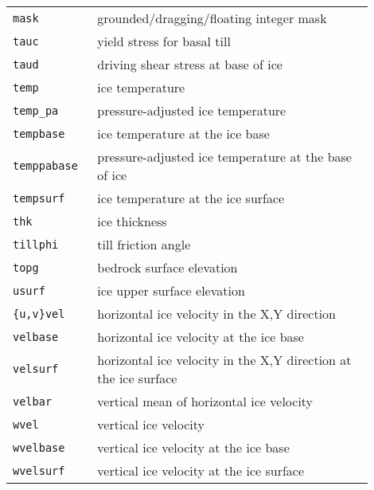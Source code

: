 \documentclass[landscape]{article}
\begin{document}
\begin{textblock}{15}
\begin{tabular}{@{}p{0.2\linewidth}p{0.7\linewidth}@{}}
  \texttt{mask} &  grounded/dragging/floating integer mask \\
  \texttt{tauc} &  yield stress for basal till \\
  \texttt{taud} &  driving shear stress at base of ice \\
  \texttt{temp} &  ice temperature \\
  \texttt{temp_pa} &  pressure-adjusted ice temperature \\
  \texttt{tempbase} &  ice temperature at the ice base\\
  \texttt{temppabase} &  pressure-adjusted ice temperature at the base of ice\\
  \texttt{tempsurf} &  ice temperature at the ice surface\\
  \texttt{thk} &  ice thickness\\
  \texttt{tillphi} &  till friction angle \\
  \texttt{topg} &  bedrock surface elevation \\
  \texttt{usurf} &  ice upper surface elevation \\
  \texttt{\{u,v\}vel} &  horizontal ice velocity in the X,Y direction \\
  \texttt{velbase} &  horizontal  ice velocity at the ice base\\
  \texttt{velsurf} &  horizontal ice velocity in the X,Y direction
  at the ice surface\\
  \texttt{velbar} &  vertical mean of horizontal ice velocity\\
  \texttt{wvel} &  vertical ice velocity \\
  \texttt{wvelbase} &  vertical ice velocity at the ice base\\
  \texttt{wvelsurf} &  vertical ice velocity at the ice surface\\
  \end{tabular}

\end{textblock}
\end{document}
